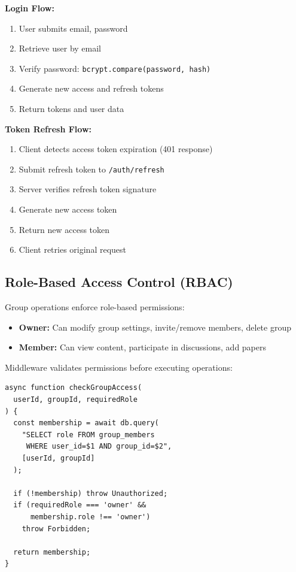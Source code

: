 \documentclass[12pt]{report}
\begin{document}
\textbf{Login Flow:}
\begin{enumerate}
    \item User submits email, password
    \item Retrieve user by email
    \item Verify password: \texttt{bcrypt.compare(password, hash)}
    \item Generate new access and refresh tokens
    \item Return tokens and user data
\end{enumerate}

\textbf{Token Refresh Flow:}
\begin{enumerate}
    \item Client detects access token expiration (401 response)
    \item Submit refresh token to \texttt{/auth/refresh}
    \item Server verifies refresh token signature
    \item Generate new access token
    \item Return new access token
    \item Client retries original request
\end{enumerate}

\subsection{Role-Based Access Control (RBAC)}

Group operations enforce role-based permissions:

\begin{itemize}
    \item \textbf{Owner:} Can modify group settings, invite/remove members, delete group
    \item \textbf{Member:} Can view content, participate in discussions, add papers
\end{itemize}

Middleware validates permissions before executing operations:

\begin{verbatim}
async function checkGroupAccess(
  userId, groupId, requiredRole
) {
  const membership = await db.query(
    "SELECT role FROM group_members 
     WHERE user_id=$1 AND group_id=$2",
    [userId, groupId]
  );
  
  if (!membership) throw Unauthorized;
  if (requiredRole === 'owner' && 
      membership.role !== 'owner') 
    throw Forbidden;
  
  return membership;
}
\end{verbatim}
\end{document}
